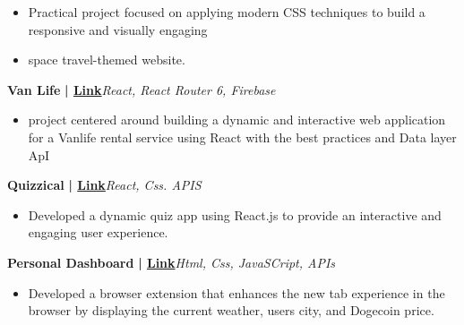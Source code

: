 \documentclass[a4paper]{article}
\begin{document}
\begin{itemize} \itemsep -3pt
\item[] Practical project focused on applying modern CSS techniques to build a responsive and visually engaging
\item[] space travel-themed website.
\end{itemize}
          \vspace*{3mm}
      {\textbf{Van Life}}\textbf{ | \href{https://keen-cobbler-54b432.netlify.app/}{Link}}\hfill{\sl React, React Router 6, Firebase}\\
          \vspace{-3mm}
\begin{itemize} \itemsep -3pt
\item[] project centered around building a dynamic and interactive web application for a Vanlife rental service using React with the best practices and Data layer ApI
\end{itemize}
          \vspace*{3mm}
      {\textbf{Quizzical}}\textbf{ | \href{https://phenomenal-chebakia-542cab.netlify.app/}{Link}}\hfill{\sl React, Css. APIS}\\
          \vspace{-3mm}
\begin{itemize} \itemsep -3pt
\item[] Developed a dynamic quiz app using React.js to provide an interactive and engaging user experience.
\end{itemize}
          \vspace*{3mm}
      {\textbf{Personal Dashboard}}\textbf{ | \href{https://github.com/MohamedZakidev/Personal-Dashboard}{Link}}\hfill{\sl Html, Css, JavaSCript, APIs}\\
          \vspace{-3mm}
\begin{itemize} \itemsep -3pt
\item[] Developed a browser extension that enhances the new tab experience in the browser by displaying the current weather, user\textquotesingle{}s city, and Dogecoin price.
\end{itemize}
          \vspace*{3mm}
\end{document}
